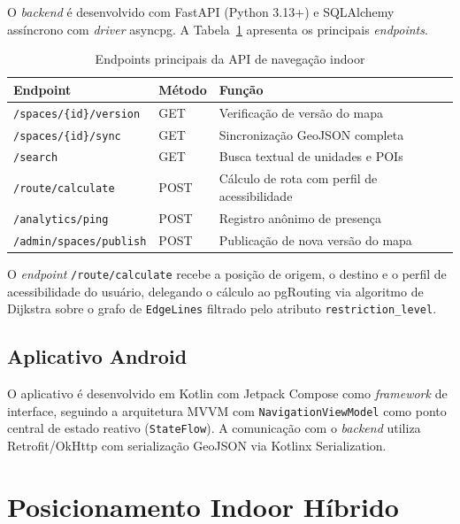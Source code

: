 \documentclass[12pt]{article}
\begin{document}
O \textit{backend} é desenvolvido com FastAPI (Python 3.13+) e SQLAlchemy assíncrono
com \textit{driver} asyncpg. A Tabela~\ref{tab:endpoints} apresenta os principais
\textit{endpoints}.

\begin{table}[ht]
\caption{Endpoints principais da API de navegação indoor}
\label{tab:endpoints}
\centering
\begin{tabular}{|l|l|l|}
\hline
\textbf{Endpoint} & \textbf{Método} & \textbf{Função} \\
\hline
\texttt{/spaces/\{id\}/version} & GET  & Verificação de versão do mapa \\
\texttt{/spaces/\{id\}/sync}    & GET  & Sincronização GeoJSON completa \\
\texttt{/search}                & GET  & Busca textual de unidades e POIs \\
\texttt{/route/calculate}       & POST & Cálculo de rota com perfil de acessibilidade \\
\texttt{/analytics/ping}        & POST & Registro anônimo de presença \\
\texttt{/admin/spaces/publish}  & POST & Publicação de nova versão do mapa \\
\hline
\end{tabular}
\end{table}

O \textit{endpoint} \texttt{/route/calculate} recebe a posição de origem, o destino
e o perfil de acessibilidade do usuário, delegando o cálculo ao pgRouting via
algoritmo de Dijkstra sobre o grafo de \texttt{EdgeLines} filtrado pelo atributo
\texttt{restriction\_level}.

\subsection{Aplicativo Android}

O aplicativo é desenvolvido em Kotlin com Jetpack Compose como \textit{framework}
de interface, seguindo a arquitetura MVVM com \texttt{NavigationViewModel} como
ponto central de estado reativo (\texttt{StateFlow}). A comunicação com o
\textit{backend} utiliza Retrofit/OkHttp com serialização GeoJSON via
Kotlinx Serialization.

\section{Posicionamento Indoor Híbrido}
\end{document}
